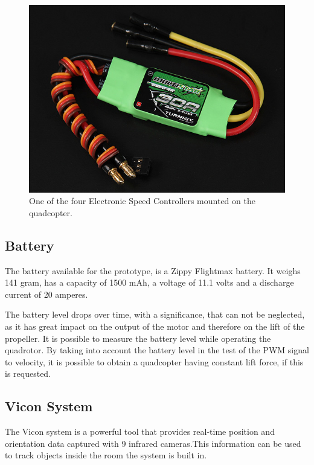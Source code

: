 \begin{figure}[H]
	\centering
	\includegraphics[scale=0.4]{figures/ESC}
	\caption{One of the four Electronic Speed Controllers mounted on the quadcopter.\cite{HKing}}
	\label{fig:esc}
\end{figure}
 
\subsection{Battery}
The battery available for the prototype, is a Zippy Flightmax battery. It weighs 141 gram, has a capacity of 1500 mAh, a voltage of 11.1 volts and a discharge current of 20 amperes.

The battery level drops over time, with a significance, that can not be neglected, as it has great impact on the output of the motor and therefore on the lift of the propeller. It is possible to measure the battery level while operating the quadrotor. By taking into account the battery level in the test of the PWM signal to velocity, it is possible to obtain a quadcopter having constant lift force, if this is requested.

\subsection{Vicon System}
The Vicon system is a powerful tool that provides real-time position and orientation data captured with 9 infrared cameras.This information can be used to track objects inside the room the system is built in.

